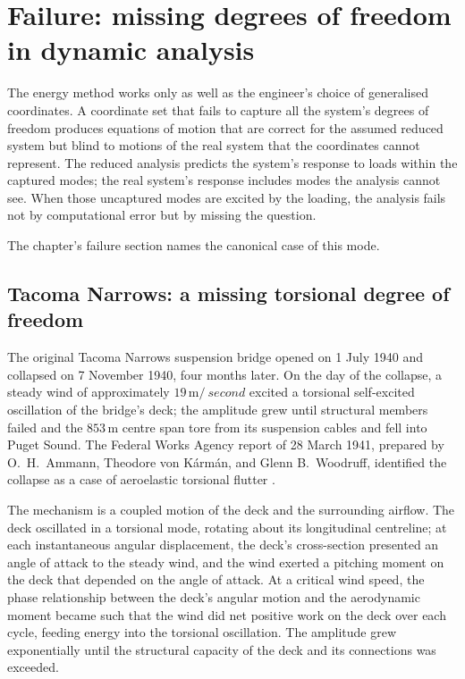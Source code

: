 \section{Failure: missing degrees of freedom in dynamic analysis}

The energy method works only as well as the engineer's choice of
generalised coordinates. A coordinate set that fails to capture all
the system's degrees of freedom produces equations of motion that are
correct for the assumed reduced system but blind to motions of the
real system that the coordinates cannot represent. The reduced
analysis predicts the system's response to loads within the
captured modes; the real system's response includes modes the
analysis cannot see. When those uncaptured modes are excited by the
loading, the analysis fails not by computational error but by
missing the question.

The chapter's failure section names the canonical case of this
mode.

\subsection{Tacoma Narrows: a missing torsional degree of freedom}

The original Tacoma Narrows suspension bridge opened on 1 July 1940
and collapsed on 7 November 1940, four months later. On the day of
the collapse, a steady wind of approximately $19\,\si{\meter\per\
second}$ excited a torsional self-excited oscillation of the bridge's
deck; the amplitude grew until structural members failed and the
$853\,\si{\meter}$ centre span tore from its suspension cables and
fell into Puget Sound. The Federal Works Agency report of 28 March
1941, prepared by O.\ H.\ Ammann, Theodore von K\'arm\'an, and Glenn
B.\ Woodruff, identified the collapse as a case of aeroelastic
torsional flutter \cite{acc:tacoma-narrows-1941}.

The mechanism is a coupled motion of the deck and the surrounding
airflow. The deck oscillated in a torsional mode, rotating about its
longitudinal centreline; at each instantaneous angular displacement,
the deck's cross-section presented an angle of attack to the steady
wind, and the wind exerted a pitching moment on the deck that
depended on the angle of attack. At a critical wind speed, the
phase relationship between the deck's angular motion and the
aerodynamic moment became such that the wind did net positive work
on the deck over each cycle, feeding energy into the torsional
oscillation. The amplitude grew exponentially until the structural
capacity of the deck and its connections was exceeded.

